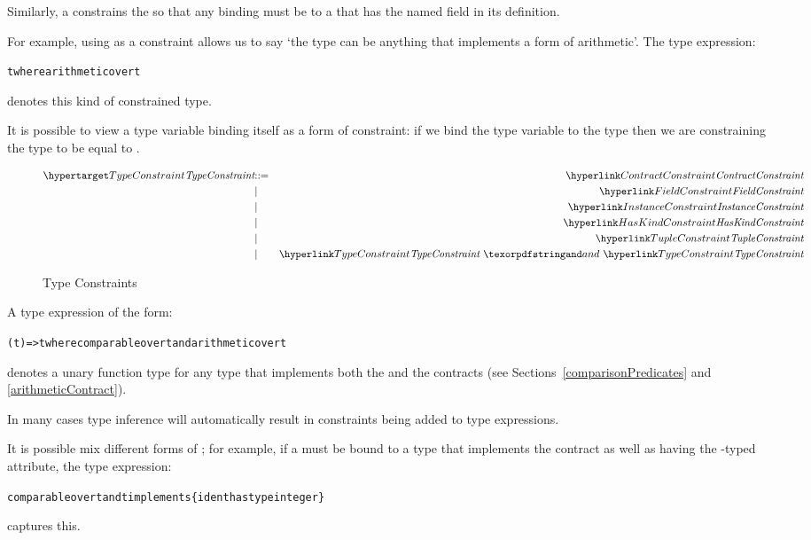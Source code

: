 Similarly, a  constrains the  so that any binding must be to a  that has the named field in its definition.

For example, using  as a constraint allows us to say `the type can be anything that implements a form of arithmetic'. The type expression:
\begin{alltt}
\pcent{}t where arithmetic over \pcent{}t
\end{alltt}
denotes this kind of constrained type.

\begin{aside}
\begin{aside}
It is possible to view a type variable binding itself as a form of constraint: if we bind the type variable  to the type  then we are constraining the type  to be equal to .
\end{aside}\end{aside}

\begin{figure}[htbp]
\begin{eqnarray*}
\ntDef{TypeConstraint}&\arrow&\ntRef{ContractConstraint}\\
&\choice&\ntRef{FieldConstraint}\\
&\choice&\ntRef{InstanceConstraint}\\
&\choice&\ntRef{HasKindConstraint}\\
&\choice&\ntRef{TupleConstraint}\\
&\choice&\ntRef{TypeConstraint}\ \q{and}\ \ntRef{TypeConstraint}
\end{eqnarray*}
\caption{Type Constraints}
\label{typeConstraintFig}
\end{figure}

A type expression of the form:
\begin{alltt}
(\pcent{}t)=>\pcent{}t where comparable over \pcent{}t and arithmetic over \pcent{}t
\end{alltt}
denotes a unary function type for any type that implements both the  and the  contracts (see Sections~\vref{comparisonPredicates} and \vref{arithmeticContract}).

\begin{aside}
In many cases type inference will automatically result in constraints being added to type expressions. 
\end{aside}

It is possible mix different forms of ; for example, if a  must be bound to a type that implements the  contract as well as having the -typed  attribute, the type expression:
\begin{alltt}
comparable over \pcent{}t and \pcent{}t implements \{ ident has type integer \}
\end{alltt}
captures this.

